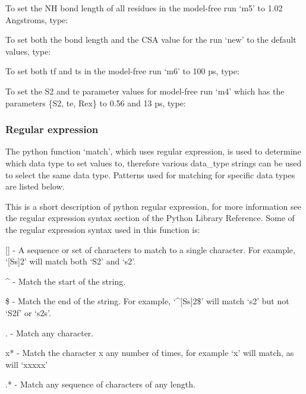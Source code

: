 

To set the NH bond length of all residues in the model-free run `m5' to 1.02 Angstroms,
type:



To set both the bond length and the CSA value for the run `new' to the default values, type:


To set both tf and ts in the model-free run `m6' to 100 ps, type:



To set the S2 and te parameter values for model-free run `m4' which has the parameters
\{S2, te, Rex\} to 0.56 and 13 ps, type:






\subsubsection{Regular expression}

The python function `match', which uses regular expression, is used to determine which data
type to set values to, therefore various data\_type strings can be used to select the same
data type.  Patterns used for matching for specific data types are listed below.

This is a short description of python regular expression, for more information see the
regular expression syntax section of the Python Library Reference.  Some of the regular
expression syntax used in this function is:

    [] - A sequence or set of characters to match to a single character.  For example,
    `[Ss]2' will match both `S2' and `s2'.

    \^{} - Match the start of the string.

    \$ - Match the end of the string.  For example, `\^{}[Ss]2\$' will match `s2' but not `S2f'
    or `s2s'.

    . - Match any character.

    x* - Match the character x any number of times, for example `x' will match, as will
    `xxxxx'

    .* - Match any sequence of characters of any length.


